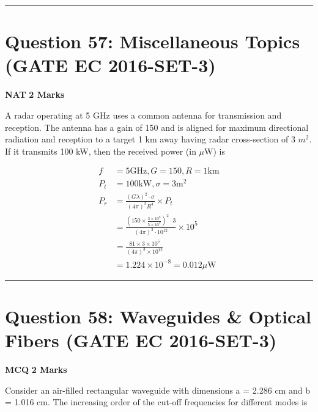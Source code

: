 \documentclass[11pt,a4paper]{article}
\begin{document}
\vspace{1.5em}
\hrule
\vspace{1.5em}

\section*{Question 57: Miscellaneous Topics (GATE EC 2016-SET-3)}
\noindent \textbf{\color{primary}NAT} \hfill \textbf{\color{secondary}2 Marks}


\noindent A radar operating at 5 GHz uses a common antenna for transmission and reception. The antenna has a gain of 150 and is aligned for maximum directional radiation and reception to a target 1 km away having radar cross-section of 3 $m^{2}$. If it transmits 100 kW, then the received power (in $\mu$W) is\underline{\hspace{1.5cm}}


\begin{tcolorbox}[solbox, title=Detailed Solution -- Question 57]
\[
\begin{aligned} f&=5 \mathrm{GHz}, G=150, R=1 \mathrm{km} \\ P_{t}&=100 \mathrm{kW}, \sigma=3 \mathrm{m}^{2} \\ P_{r}&= \frac{(G \lambda)^{2} \cdot \sigma}{(4 \pi)^{3} R^{4}} \times P_{t} \\ &=\frac{\left(150 \times \frac{3 \times 10^{8}}{5 \times 10^{9}}\right)^{2} \cdot 3}{(4 \pi)^{3} \cdot 10^{12}} \times 10^{5} \\ &=\frac{81 \times 3 \times 10^{5}}{(4 \pi)^{3} \times 10^{12}} \\ &= 1.224 \times 10^{-8}=0.012 \mu \mathrm{W} \end{aligned}
\]
\end{tcolorbox}

\vspace{1.5em}
\hrule
\vspace{1.5em}

\section*{Question 58: Waveguides \& Optical Fibers (GATE EC 2016-SET-3)}
\noindent \textbf{\color{primary}MCQ} \hfill \textbf{\color{secondary}2 Marks}


\noindent Consider an air-filled rectangular waveguide with dimensions a = 2.286 cm and b = 1.016 cm. The increasing order of the cut-off frequencies for different modes is
\end{document}
